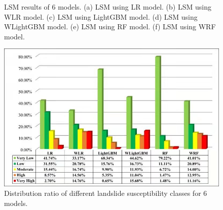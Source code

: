 \documentclass[a4paper,fleqn]{cas-sc}
\begin{document}
\begin{figure}
{  }
  \quad
  \quad
  \caption{LSM results of 6 models. (a) LSM using LR model. (b) LSM using WLR model. (c) LSM using LightGBM model. (d) LSM using WLightGBM model. (e) LSM using RF model. (f) LSM using WRF model.}
  \label{LSM_Results}
\end{figure}

\begin{figure}
\centering
\includegraphics[width=12 cm]{Definitions/Fig_LPI.jpg}
\caption{Distribution ratio of different landslide susceptibility classes for 6 models.}
\label{Fig_distribution}
\end{figure} 
\end{document}

